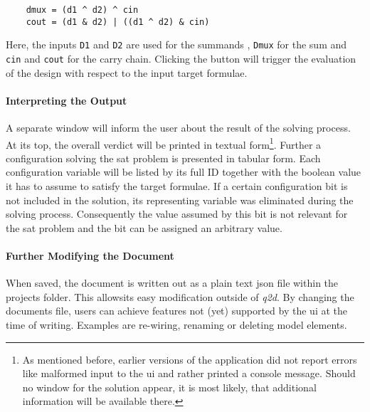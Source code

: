 	\begin{verbatim}
	dmux = (d1 ^ d2) ^ cin
	cout = (d1 & d2) | ((d1 ^ d2) & cin)
	\end{verbatim}

	Here, the inputs \texttt{D1} and \texttt{D2} are used for the summands	, \texttt{Dmux} for the sum and \texttt{cin} and \texttt{cout} for the carry chain.
	Clicking the  button will trigger the evaluation of the design with respect to the input target formulae.
	
	\paragraph{Interpreting the Output}
	A separate window will inform the user about the result of the solving process.
	At its top, the overall verdict will be printed in textual form\footnote{
		As mentioned before, earlier versions of the application did not report errors like malformed input to the \gls{ui} and rather printed a console message.
		Should no window for the solution appear, it is most likely, that additional information will be available there.	
	}.
	Further a configuration solving the \gls{sat} problem is presented in tabular form.
	Each configuration variable will be listed by its full ID together with the boolean value it has to assume to satisfy the target formulae.
	If a certain configuration bit is not included in the solution, its representing variable was eliminated during the solving process.
	Consequently the value assumed by this bit is not relevant for the \gls{sat} problem and the bit can be assigned an arbitrary value.
	
	\paragraph{Further Modifying the Document}
	When saved, the document is written out as a plain text \gls{json} file within the projects folder.
	This allowsits  easy modification outside of \emph{q2d}.
	By changing the documents file, users can achieve features not (yet) supported by the \gls{ui} at the time of writing.
	Examples are re-wiring, renaming or deleting model elements. 